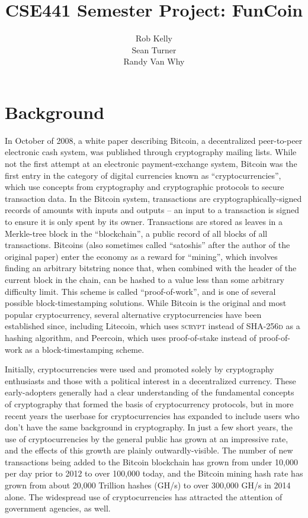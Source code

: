 \documentclass[12pt]{article}
\begin{document}
\title{CSE441 Semester Project: FunCoin}
\author{Rob Kelly\\Sean Turner\\Randy Van Why}
\maketitle

\section{Background}
In October of 2008, a white paper\cite{nakamoto:bitcoin} describing Bitcoin, a decentralized peer-to-peer electronic cash system, was published through cryptography mailing lists. While not the first attempt at an electronic payment-exchange system, Bitcoin was the first entry in the category of digital currencies known as ``cryptocurrencies'', which use concepts from cryptography and cryptographic protocols to secure transaction data. In the Bitcoin system, transactions are cryptographically-signed records of amounts with inputs and outputs -- an input to a transaction is signed to ensure it is only spent by its owner. Transactions are stored as leaves in a Merkle-tree block in the ``blockchain'', a public record of all blocks of all transactions. Bitcoins (also sometimes called ``satoshis'' after the author of the original paper) enter the economy as a reward for ``mining'', which involves finding an arbitrary bitstring nonce that, when combined with the header of the current block in the chain, can be hashed to a value less than some arbitrary difficulty limit. This scheme is called ``proof-of-work'', and is one of several possible block-timestamping solutions. While Bitcoin is the original and most popular cryptocurrency, several alternative cryptocurrencies have been established since, including Litecoin\cite{mcmillan:litecoin}, which uses \textsc{scrypt} instead of \textsc{SHA-256d} as a hashing algorithm, and Peercoin\cite{king:peercoin}, which uses proof-of-stake instead of proof-of-work as a block-timestamping scheme.

Initially, cryptocurrencies were used and promoted solely by cryptography enthusiasts\cite{slashdot:bitcoin} and those with a political interest in a decentralized currency. These early-adopters generally had a clear understanding of the fundamental concepts of cryptography that formed the basis of cryptocurrency protocols, but in more recent years the userbase for cryptocurrencies has expanded to include users who don't have the same background in cryptography. In just a few short years, the use of cryptocurrencies by the general public has grown at an impressive rate, and the effects of this growth are plainly outwardly-visible. The number of new transactions being added to the Bitcoin blockchain has grown from under 10,000 per day prior to 2012 to over 100,000 today\cite{blockchain:transactions}, and the Bitcoin mining hash rate has grown from about 20,000 Trillion hashes (GH/s) to over 300,000 GH/s in 2014 alone\cite{blockchain:hashrate}. The widespread use of cryptocurrencies has attracted the attention of government agencies\cite{irs:bitcoin}, as well.
\end{document}
